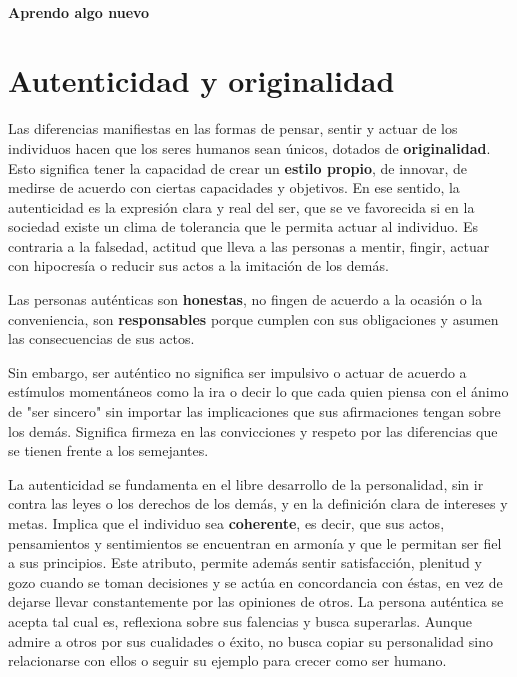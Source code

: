 \documentclass[10pt,twoside]{article}
\begin{document}
\paragraph*{Aprendo algo nuevo}
\section*{Autenticidad y originalidad}
Las diferencias manifiestas en las formas de pensar, sentir
y actuar de los individuos hacen que los seres humanos
sean únicos, dotados de \textbf{originalidad}. Esto significa tener la capacidad de crear un \textbf{estilo propio}, de innovar, de medirse de acuerdo con ciertas capacidades y objetivos. En ese sentido, la autenticidad es la expresión clara y real del ser, que se ve favorecida si en la sociedad existe un clima de tolerancia que le permita actuar al individuo. Es contraria a la falsedad, actitud que lleva a las personas a mentir, fingir, actuar con hipocresía o reducir sus actos a la imitación de los demás.

Las personas auténticas son \textbf{honestas}, no fingen de acuerdo a la ocasión o la conveniencia, son \textbf{responsables} porque cumplen con sus obligaciones y asumen las consecuencias de sus actos.

Sin embargo, ser auténtico no significa ser impulsivo o
actuar de acuerdo a estímulos momentáneos como la ira o
decir lo que cada quien piensa con el ánimo de "ser sincero" sin importar las implicaciones que sus afirmaciones tengan sobre los demás. Significa firmeza en las convicciones y respeto por las diferencias que se tienen frente a los semejantes.

La autenticidad se fundamenta en el libre desarrollo de la
personalidad, sin ir contra las leyes o los derechos de los
demás, y en la definición clara de intereses y metas. Implica
que el individuo sea \textbf{coherente}, es decir, que sus actos, pensamientos y sentimientos se encuentran en armonía y
que le permitan ser fiel a sus principios. Este atributo, permite además sentir satisfacción, plenitud y gozo cuando se toman decisiones y se actúa en concordancia con éstas, en vez de dejarse llevar constantemente por las opiniones de otros.
La persona auténtica se acepta tal cual es, reflexiona sobre
sus falencias y busca superarlas. Aunque admire a otros por
sus cualidades o éxito, no busca copiar su personalidad sino
relacionarse con ellos o seguir su ejemplo para crecer como
ser humano.
\end{document}
